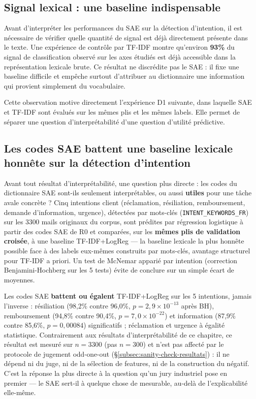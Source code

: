 \documentclass[11pt]{article}
\begin{document}
\subsection{Signal lexical : une baseline indispensable}
\label{subsec:lexical-leakage}

Avant d'interpréter les performances du SAE sur la détection d'intention, il est
nécessaire de vérifier quelle quantité de signal est déjà directement présente dans
le texte. Une expérience de contrôle par TF-IDF montre qu'environ \textbf{93\%} du
signal de classification observé sur les axes étudiés est déjà accessible dans la
représentation lexicale brute. Ce résultat ne discrédite pas le SAE : il fixe une
baseline difficile et empêche surtout d'attribuer au dictionnaire une information
qui provient simplement du vocabulaire.

Cette observation motive directement l'expérience D1 suivante, dans laquelle SAE et
TF-IDF sont évalués sur les mêmes plis et les mêmes labels. Elle permet de séparer une
question d'interprétabilité d'une question d'utilité prédictive.

\subsection{Les codes SAE battent une baseline lexicale honnête sur la détection d'intention}
\label{subsec:d1-intent}

Avant tout résultat d'interprétabilité, une question plus directe : les
codes du dictionnaire SAE sont-ils seulement interprétables, ou aussi
\textbf{utiles} pour une tâche avale concrète ? Cinq intentions client
(réclamation, résiliation, remboursement, demande d'information, urgence),
détectées par mots-clés (\texttt{INTENT\_KEYWORDS\_FR}) sur les 3300 mails
originaux du corpus, sont prédites par régression logistique à partir des
codes SAE de R0 et comparées, sur les \textbf{mêmes plis de validation
croisée}, à une baseline TF-IDF+LogReg --- la baseline lexicale la plus
honnête possible face à des labels eux-mêmes construits par mots-clés,
avantage structurel pour TF-IDF a priori. Un test de McNemar apparié par
intention (correction Benjamini-Hochberg sur les 5 tests) évite de conclure
sur un simple écart de moyennes.

\begin{resultbox}[D1 --- SAE contre TF-IDF+LogReg ($n{=}3300$)]
Les codes SAE \textbf{battent ou égalent} TF-IDF+LogReg sur les 5 intentions,
jamais l'inverse : résiliation (98,2\% contre 96,0\%, $p=2{,}9\times10^{-13}$
après BH), remboursement (94,8\% contre 90,4\%, $p=7{,}0\times10^{-22}$) et
information (87,9\% contre 85,6\%, $p=0{,}00084$) significatifs ;
réclamation et urgence à égalité statistique. Contrairement aux résultats
d'interprétabilité de ce chapitre, ce résultat est mesuré sur $n=3300$ (pas
$n=300$) et n'est pas affecté par le protocole de jugement odd-one-out
(\S\ref{subsec:sanity-check-resultats}) : il ne dépend ni du juge, ni de la
sélection de features, ni de la construction du négatif. C'est la réponse la
plus directe à la question qu'un jury industriel pose en premier --- le SAE
sert-il à quelque chose de mesurable, au-delà de l'explicabilité elle-même.
\end{resultbox}
\end{document}
